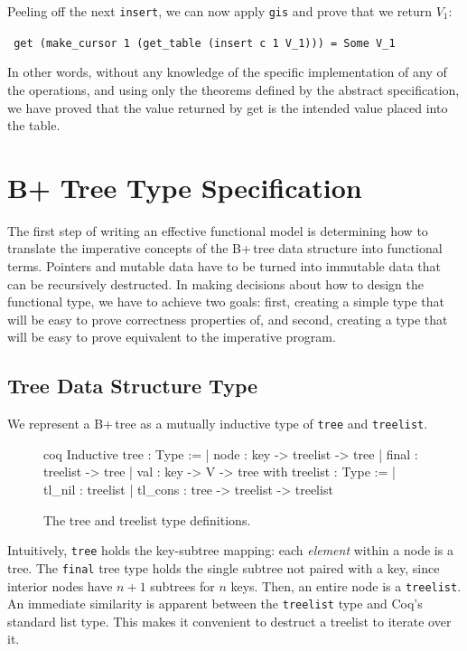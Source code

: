 \documentclass[12pt]{article}
\begin{document}
Peeling off the next \texttt{insert}, we can now apply \texttt{gis} and prove that we return $V_1$:

\begin{center}\texttt{
    get (make\_cursor 1 (get\_table (insert c 1 V\_1))) = Some V\_1
}\end{center}

In other words, without any knowledge of the specific implementation of any of the operations, and using only the theorems defined by the abstract specification, we have proved that the value returned by get is the intended value placed into the table.

\setlength{\parskip}{1em}
\clearpage

\section{B+ Tree Type Specification} \label{sec:typedef}

The first step of writing an effective functional model is determining how to translate the imperative concepts of the B+\,tree data structure into functional terms. Pointers and mutable data have to be turned into immutable data that can be recursively destructed. In making decisions about how to design the functional type, we have to achieve two goals: first, creating a simple type that will be easy to prove correctness properties of, and second, creating a type that will be easy to prove equivalent to the imperative program.

\subsection{Tree Data Structure Type}

We represent a B+\,tree as a mutually inductive type of \texttt{tree} and \texttt{treelist}.

\begin{singlespace}
\begin{figure}[ht]
\centering
\begin{cminted}{coq}
Inductive tree : Type :=
 | node : key -> treelist -> tree
 | final : treelist -> tree
 | val : key -> V -> tree
with treelist : Type :=
 | tl_nil : treelist
 | tl_cons : tree -> treelist -> treelist
\end{cminted}
\caption{The tree and treelist type definitions.}
\end{figure}
\end{singlespace}

Intuitively, \texttt{tree} holds the key-subtree mapping: each \textit{element} within a node is a tree. The \texttt{final} tree type holds the single subtree not paired with a key, since interior nodes have $n+1$ subtrees for $n$ keys. Then, an entire node is a \texttt{treelist}. An immediate similarity is apparent between the \texttt{treelist} type and Coq’s standard list type. This makes it convenient to destruct a treelist to iterate over it.
\end{document}
